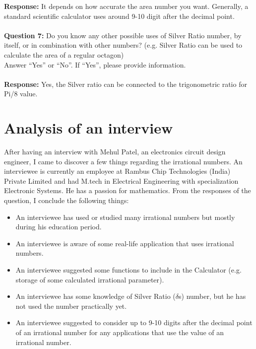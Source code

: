 \textbf{Response:} It depends on how accurate the area number you want. Generally, a standard scientific calculator uses around 9-10 digit after the decimal point. \\ \\
\textbf{Question 7:} Do you know any other possible uses of Silver Ratio number, by itself, or in combination with other numbers? (e.g. Silver Ratio can be used to calculate the area of a regular octagon) \\ Answer “Yes” or “No”. If “Yes”, please provide information. \\ \\
\textbf{Response:} Yes, the Silver ratio can be connected to the trigonometric ratio for Pi/8 value. 

\section{Analysis of an interview}
After having an interview with Mehul Patel, an electronics circuit design engineer, I came to discover a few things regarding the irrational numbers. An interviewee is currently an employee at Rambus Chip Technologies (India) Private Limited and had M.tech in Electrical Engineering with specialization Electronic Systems. He has a passion for mathematics. From the responses of the question, I conclude the following things:\par

\begin{itemize}
	\item An interviewee has used or studied many irrational numbers but mostly during his education period.\par

	\item An interviewee is aware of some real-life application that uses irrational numbers.\par

	\item An interviewee suggested some functions to include in the Calculator (e.g. storage of some calculated irrational parameter).\par

	\item An interviewee has some knowledge of Silver Ratio ($ \delta $s) number, but he has not used the number practically yet.\par

	\item An interviewee suggested to consider up to 9-10 digits after the decimal point of an irrational number for any applications that use the value of an irrational number.
\end{itemize}\par







